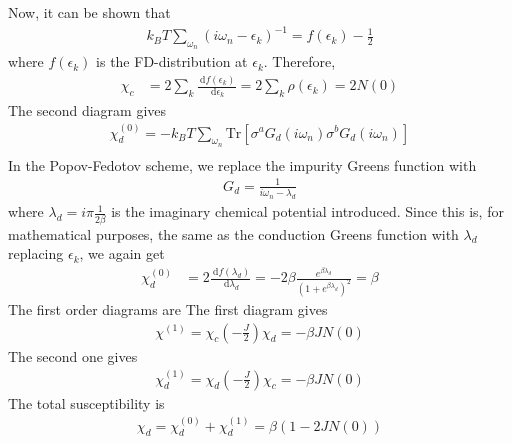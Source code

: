 \documentclass[twoside,11pt]{report}
\numberwithin{equation}{section}
\begin{document}
Now, it can be shown that
\begin{equation}\begin{aligned}
	k_B T\sum_{\omega_n} \left(i\omega_n - \epsilon_k\right)^{-1} = f(\epsilon_k) - \frac{1}{2}
\end{aligned}\end{equation}
where \(f(\epsilon_k)\) is the FD-distribution at \(\epsilon_k\).
Therefore,
\begin{equation}\begin{aligned}
	\chi_c &=2 \sum_k \frac{\:\mathrm{d}f(\epsilon_k)}{\:\mathrm{d}\epsilon_k}= 2\sum_k \rho(\epsilon_k) = 2 N(0)
\end{aligned}\end{equation}
The second diagram gives
\begin{equation}\begin{aligned}
	\chi_d^{(0)} = -k_B T \sum_{\omega_n} \text{Tr}\left[\sigma^a G_d(i\omega_n)\sigma^bG_d(i\omega_n)\right] \\
\end{aligned}\end{equation}
In the Popov-Fedotov scheme, we replace the impurity Greens function with
\begin{equation}\begin{aligned}
G_d = \frac{1}{i\omega_n - \lambda_d}
\end{aligned}\end{equation}
where \(\lambda_d = i\pi\frac{1}{2\beta}\) is the imaginary chemical potential introduced.
Since this is, for mathematical purposes, the same as the conduction Greens function with \(\lambda_d\) replacing \(\epsilon_k\), we again get
\begin{equation}\begin{aligned}
	\chi^{(0)}_d &=2 \frac{\:\mathrm{d}f(\lambda_d)}{\:\mathrm{d}\lambda_d}= -2\beta\frac{e^{\beta \lambda_d}}{\left(1+e^{\beta \lambda_d}\right)^2} = \beta
\end{aligned}\end{equation}
The first order diagrams are
The first diagram gives
\begin{equation}\begin{aligned}
	\chi^{(1)} = \chi_c \left(-\frac{J}{2}\right) \chi_d = -\beta JN(0)
\end{aligned}\end{equation}
The second one gives
\begin{equation}\begin{aligned}
	\chi_d^{(1)} = \chi_d \left(-\frac{J}{2}\right) \chi_c = -\beta JN(0)
\end{aligned}\end{equation}
The total susceptibility is
\begin{equation}\begin{aligned}
	\chi_d = \chi^{(0)}_d + \chi_d^{(1)} = \beta\left(1 - 2 J N(0)\right)
\end{aligned}\end{equation}
\end{document}
